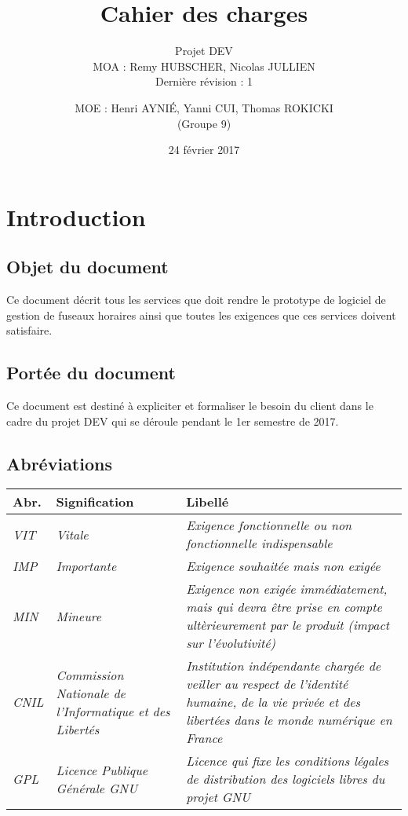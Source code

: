 \documentclass[majeure,gl]{tb}
\date{24 février 2017}
\title[Cahier des charges]{Cahier des charges}
\subtitle{Projet DEV \\ MOA : Remy HUBSCHER, Nicolas JULLIEN \\ Dernière révision : 1}
\author{MOE : Henri AYNIÉ, Yanni CUI, Thomas ROKICKI \\ \small(Groupe 9)}
\begin{document}
\maketitle

\clearpage
\renewcommand\contentsname{Sommaire}
\tableofcontents


\clearpage






\clearpage
\section{Introduction}

\subsection{Objet du document}
Ce document décrit tous les services que doit rendre le prototype de
logiciel de gestion de fuseaux horaires ainsi
que toutes les exigences que ces services doivent satisfaire.


\subsection{Portée du document}

Ce document est destiné à expliciter et formaliser le besoin du client
 dans le cadre du projet DEV qui se
déroule pendant le 1er semestre de 2017.



\subsection{Abréviations}
\label{sec:abreviation}

\begin{tabular}[c]{|p{1cm}|p{2.6cm}|p{12.4cm}|}
  \hline
  \textbf{Abr.} & \textbf{Signification} & \textbf{Libellé}
  \\\hline
  \textit{VIT} & \textit{Vitale} & \textit{Exigence fonctionnelle ou non fonctionnelle indispensable}
  \\\hline
  \textit{IMP} & \textit{Importante} & \textit{Exigence souhaitée mais non exigée}
  \\\hline
  \textit{MIN} & \textit{Mineure} &
  \textit{Exigence non exigée immédiatement, mais qui devra être prise en compte
    ultèrieurement par le produit (impact sur l'évolutivité)}
  \\\hline
  \textit{CNIL} & \textit{Commission Nationale de l'Informatique et des Libertés} &
  \textit{Institution indépendante chargée de veiller au respect de l'identité humaine, de la vie privée et des libertées dans le monde numérique en France}
  \\\hline
  \textit{GPL} & \textit{Licence Publique Générale GNU} &
  \textit{Licence qui fixe les conditions légales de distribution des logiciels libres du projet GNU}
  \\\hline
\end{tabular}
\end{document}
